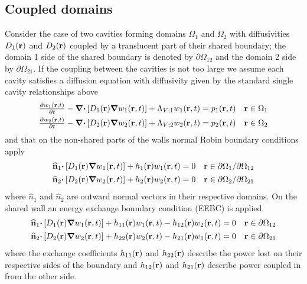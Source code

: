 \documentclass[a4paper]{article}
\numberwithin{equation}{section}
\begin{document}
\subsection[Coupled domains]{Coupled domains}
\label{sc:sum:coup}

Consider the case of two cavities forming domains $\Omega_1$ and $\Omega_2$ with
diffusivities $D_1(\boldsymbol{\mathrm{r}})$ and $D_2(\boldsymbol{\mathrm{r}})$ coupled by a translucent part of their 
shared boundary; the domain 1 side of the shared boundary is denoted by 
${\partial}\Omega_{12}$ and the domain 2 side by ${\partial}\Omega_{21}$.
If the coupling between the cavities is not too large we assume each cavity 
satisfies a diffusion equation with diffusivity given by the standard single 
cavity relationships above
\begin{align}
\begin{matrix}
\frac{{\partial}w_1(\boldsymbol{\mathrm{r}},t)}{{\partial}t}-{\boldsymbol{\mathrm{\nabla}}}{\boldsymbol{\mathrm{\cdot}}}\left[D_1(\boldsymbol{\mathrm{r}}){\boldsymbol{\mathrm{\nabla}}}w_1(\boldsymbol{\mathrm{r}},t)\right]+\Lambda_{V;1}w_1(\boldsymbol{\mathrm{r}},t) = p_1(\boldsymbol{\mathrm{r}},t) &\boldsymbol{\mathrm{r}}\in\Omega_1
\end{matrix} \\
\begin{matrix}
\frac{{\partial}w_2(\boldsymbol{\mathrm{r}},t)}{{\partial}t}-{\boldsymbol{\mathrm{\nabla}}}{\boldsymbol{\mathrm{\cdot}}}\left[D_2(\boldsymbol{\mathrm{r}}){\boldsymbol{\mathrm{\nabla}}}w_2(\boldsymbol{\mathrm{r}},t)\right]+\Lambda_{V;2}w_2(\boldsymbol{\mathrm{r}},t) = p_2(\boldsymbol{\mathrm{r}},t) &\boldsymbol{\mathrm{r}}\in\Omega_2
\end{matrix}
\end{align}
and that on the non-shared parts of the walls normal Robin boundary conditions
apply
\begin{align}
\begin{matrix}
\widehat{\boldsymbol{\mathrm{n}}}_1{\boldsymbol{\mathrm{\cdot}}}\left[D_1(\boldsymbol{\mathrm{r}}){\boldsymbol{\mathrm{\nabla}}}w_1(\boldsymbol{\mathrm{r}},t)\right]+h_1(\boldsymbol{\mathrm{r}}) w_1(\boldsymbol{\mathrm{r}},t) = 0 &\boldsymbol{\mathrm{r}}\in\partial\Omega_1/\partial\Omega_{12}
\end{matrix}\\
\begin{matrix}
\widehat{\boldsymbol{\mathrm{n}}}_2{\boldsymbol{\mathrm{\cdot}}}\left[D_2(\boldsymbol{\mathrm{r}}){\boldsymbol{\mathrm{\nabla}}}w_2(\boldsymbol{\mathrm{r}},t)\right]+h_2(\boldsymbol{\mathrm{r}}) w_2(\boldsymbol{\mathrm{r}},t) = 0 &\boldsymbol{\mathrm{r}}\in\partial\Omega_2/\partial\Omega_{21}
\end{matrix}
\end{align}
where  $\widehat  n_1$ and  $\widehat  n_2$ are outward normal vectors in their
respective domains. On the shared wall an energy exchange boundary condition (EEBC) is
applied~\citep{Billon2008}
\begin{align}
\label{eq:eebc1}
\begin{matrix}
\uvn_1{\vcdot}\left[D_1\pr{\vnabla}w_1\prt\right]+h_{11}\pr w_1\prt-h_{12}\pr w_2\prt = 0 &\vr\in\partial\Omega_{12}
\end{matrix}\\
\label{eq:eebc2}
\begin{matrix}
\uvn_2{\vcdot}\left[D_2\pr{\vnabla}w_2\prt\right]+h_{22}\pr w_2\prt-h_{21}\pr w_1\prt = 0 &\vr\in\partial\Omega_{21}
\end{matrix}
\end{align}
where the exchange coefficients $h_{11}(\boldsymbol{\mathrm{r}})$ and $h_{22}(\boldsymbol{\mathrm{r}})$ describe the power lost 
on their respective sides of the boundary and $h_{12}(\boldsymbol{\mathrm{r}})$ and $h_{21}(\boldsymbol{\mathrm{r}})$ describe power
coupled in from the other side.
\end{document}
